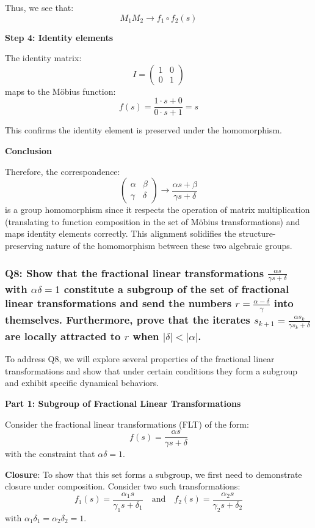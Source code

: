 \documentclass[8pt]{article}
\begin{document}
Thus, we see that:
\[ M_1 M_2 \longrightarrow f_1 \circ f_2(s) \]

\textbf{Step 4: Identity elements}

The identity matrix:
\[ I = \begin{pmatrix} 1 & 0 \\ 0 & 1 \end{pmatrix} \]
maps to the Möbius function:
\[ f(s) = \frac{1 \cdot s + 0}{0 \cdot s + 1} = s \]

This confirms the identity element is preserved under the homomorphism.

\textbf{Conclusion}

Therefore, the correspondence:
\[ \begin{pmatrix} \alpha & \beta \\ \gamma & \delta \end{pmatrix} \longrightarrow \frac{\alpha s + \beta}{\gamma s + \delta} \]
is a group homomorphism since it respects the operation of matrix multiplication (translating to function composition in the set of Möbius transformations) and maps identity elements correctly. This alignment solidifies the structure-preserving nature of the homomorphism between these two algebraic groups.

\subsubsection*{Q8: Show that the fractional linear transformations \( \frac{\alpha s}{\gamma s + \delta} \) with \( \alpha \delta = 1 \) constitute a subgroup of the set of fractional linear transformations and send the numbers \( r = \frac{\alpha - \delta}{\gamma} \) into themselves. Furthermore, prove that the iterates \( s_{k+1} = \frac{\alpha s_k}{\gamma s_k + \delta} \) are locally attracted to \( r \) when \( |\delta| < |\alpha| \).}

To address Q8, we will explore several properties of the fractional linear transformations and show that under certain conditions they form a subgroup and exhibit specific dynamical behaviors.

\textbf{Part 1: Subgroup of Fractional Linear Transformations}

Consider the fractional linear transformations (FLT) of the form:
\[ f(s) = \frac{\alpha s}{\gamma s + \delta} \]
with the constraint that \( \alpha \delta = 1 \).

\textbf{Closure}: To show that this set forms a subgroup, we first need to demonstrate closure under composition. Consider two such transformations:
\[ f_1(s) = \frac{\alpha_1 s}{\gamma_1 s + \delta_1} \quad \text{and} \quad f_2(s) = \frac{\alpha_2 s}{\gamma_2 s + \delta_2} \]
with \( \alpha_1 \delta_1 = \alpha_2 \delta_2 = 1 \).
\end{document}
